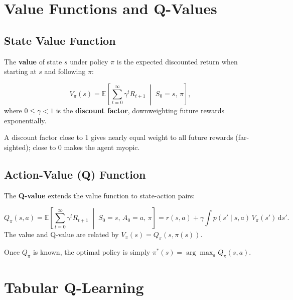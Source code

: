 \documentclass[11pt,a4paper]{article}
\theoremstyle{definition}
\theoremstyle{plain}
\theoremstyle{remark}
\begin{document}
\section{Value Functions and Q-Values}

\subsection{State Value Function}

The \textbf{value} of state $s$ under policy $\pi$ is the expected discounted return when starting at $s$ and following $\pi$:

\begin{tcolorbox}[colback=blue!5!white,colframe=blue!75!black,title=\textbf{State Value Function}]
\[
    V_\pi(s) = \mathbb{E}\!\left[\sum_{t=0}^{\infty} \gamma^t R_{t+1} \;\middle|\; S_0 = s,\, \pi\right],
\]
where $0 \le \gamma < 1$ is the \textbf{discount factor}, downweighting future rewards exponentially.
\end{tcolorbox}

A discount factor close to 1 gives nearly equal weight to all future rewards (far-sighted); close to 0 makes the agent myopic.

\subsection{Action-Value (Q) Function}

The \textbf{Q-value} extends the value function to state-action pairs:

\begin{tcolorbox}[colback=blue!5!white,colframe=blue!75!black,title=\textbf{Action-Value Function}]
\[
    Q_\pi(s, a) = \mathbb{E}\!\left[\sum_{t=0}^{\infty} \gamma^t R_{t+1} \;\middle|\; S_0 = s,\, A_0 = a,\, \pi\right]
    = r(s, a) + \gamma \int p(s' \mid s, a)\, V_\pi(s')\,\mathrm{d}s'.
\]
The value and Q-value are related by $V_\pi(s) = Q_\pi(s, \pi(s))$.
\end{tcolorbox}

Once $Q_\pi$ is known, the optimal policy is simply $\pi^*(s) = \arg\max_a Q_\pi(s, a)$.

\section{Tabular Q-Learning}
\end{document}
